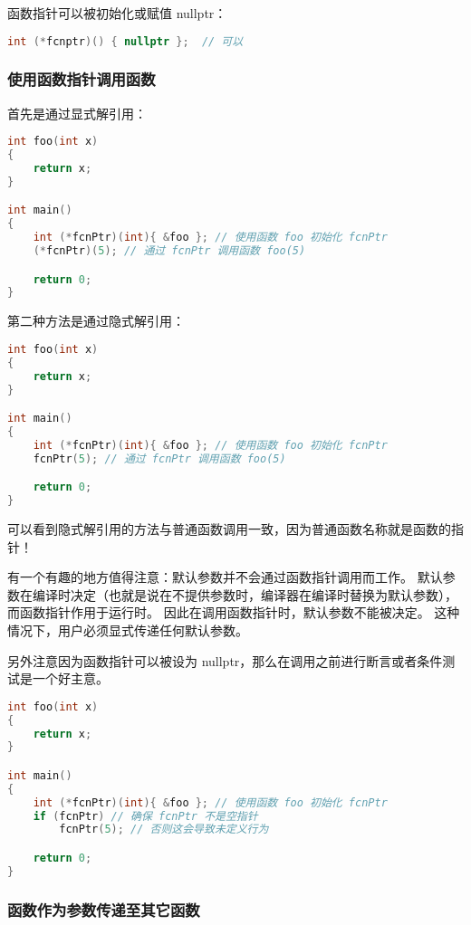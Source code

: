 \documentclass[../../LearnCpp.tex]{subfiles}
\begin{document}
函数指针可以被初始化或赋值 nullptr：

\begin{lstlisting}[language=C++]
int (*fcnptr)() { nullptr };  // 可以
\end{lstlisting}

\subsubsection*{使用函数指针调用函数}

首先是通过显式解引用：

\begin{lstlisting}[language=C++]
int foo(int x)
{
    return x;
}

int main()
{
    int (*fcnPtr)(int){ &foo }; // 使用函数 foo 初始化 fcnPtr
    (*fcnPtr)(5); // 通过 fcnPtr 调用函数 foo(5)

    return 0;
}
\end{lstlisting}

第二种方法是通过隐式解引用：

\begin{lstlisting}[language=C++]
int foo(int x)
{
    return x;
}

int main()
{
    int (*fcnPtr)(int){ &foo }; // 使用函数 foo 初始化 fcnPtr
    fcnPtr(5); // 通过 fcnPtr 调用函数 foo(5)

    return 0;
}
\end{lstlisting}

可以看到隐式解引用的方法与普通函数调用一致，因为普通函数名称就是函数的指针！

有一个有趣的地方值得注意：默认参数并不会通过函数指针调用而工作。
默认参数在编译时决定（也就是说在不提供参数时，编译器在编译时替换为默认参数），而函数指针作用于运行时。
因此在调用函数指针时，默认参数不能被决定。
这种情况下，用户必须显式传递任何默认参数。

另外注意因为函数指针可以被设为 nullptr，那么在调用之前进行断言或者条件测试是一个好主意。

\begin{lstlisting}[language=C++]
int foo(int x)
{
    return x;
}

int main()
{
    int (*fcnPtr)(int){ &foo }; // 使用函数 foo 初始化 fcnPtr
    if (fcnPtr) // 确保 fcnPtr 不是空指针
        fcnPtr(5); // 否则这会导致未定义行为

    return 0;
}
\end{lstlisting}

\subsubsection*{函数作为参数传递至其它函数}
\end{document}
